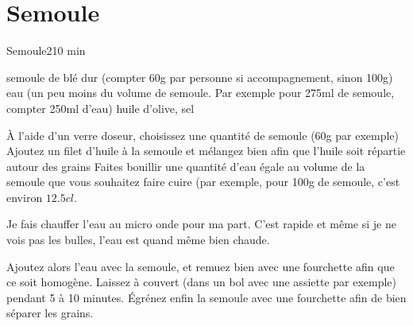 {\section{Semoule}
\begin{recette}{Semoule}{2}{10 min}{}
\begin{ingredients}
\ingredient semoule de blé dur (compter 60g par personne si accompagnement, sinon 100g)
\ingredient eau (un peu moins du volume de semoule. Par exemple pour 275ml de semoule, compter 250ml d'eau)
\ingredient huile d'olive, sel
\end{ingredients}

\begin{preparation}
\etape À l'aide d'un verre doseur, choisissez une quantité de semoule (60g par exemple)
\etape Ajoutez un filet d'huile à la semoule et mélangez bien afin que l'huile soit répartie autour des grains
\etape Faites bouillir une quantité d'eau égale au volume de la semoule que vous souhaitez faire cuire (par exemple, pour 100g 
de semoule, c'est environ $12.5\unit{cl}$. 
\begin{remarque}
Je fais chauffer l'eau au micro onde pour ma part. C'est rapide et même si je ne vois pas les bulles, l'eau est quand même bien 
chaude. 
\end{remarque}
\etape Ajoutez alors l'eau avec la semoule, et remuez bien avec une fourchette afin que ce soit homogène. Laissez à couvert 
(dans un bol avec une assiette par exemple) pendant 5 à 10 minutes.
\etape Égrénez enfin la semoule avec une fourchette afin de bien séparer les grains.
\end{preparation}
\end{recette}


}%
